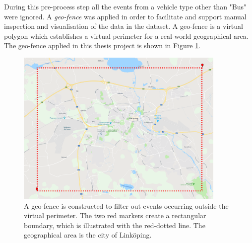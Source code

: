 During this pre-process step all the events from a vehicle type other than "Bus" were ignored.
A \textit{geo-fence} was applied in order to facilitate and support manual inspection and visualisation of the data in the dataset.
A geo-fence is a virtual polygon which establishes a virtual perimeter for a real-world geographical area.
The geo-fence applied in this thesis project is shown in Figure \ref{fig:geo-fence}.

\begin{figure}[t]
    \centering
    \includegraphics[width=0.9\textwidth]{figures/geofencing_linkoping}
    \caption[A geo-fence is constructed to filter out events occurring outside the virtual perimeter]
    {\small A geo-fence is constructed to filter out events occurring outside the virtual perimeter.
    The two red markers create a rectangular boundary, which is illustrated with the red-dotted line.
    The geographical area is the city of Linköping.}
    \label{fig:geo-fence}
\end{figure}

